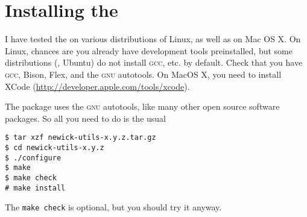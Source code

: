 \chapter{Installing the \nutils}

I have tested the \nutils{} on various distributions of Linux, as well as on
Mac OS X. On Linux, chances are you already have development tools
preinstalled, but some distributions (\eg, Ubuntu) do not install \textsc{gcc},
etc. by default. Check that you have \textsc{gcc},
Bison, Flex, and the \textsc{gnu} autotools. On MacOS X, you need to
install XCode (\url{http://developer.apple.com/tools/xcode}). 

The package uses the \textsc{gnu} autotools, like many other open source
software packages. So all you need to do is the usual
\begin{verbatim}
$ tar xzf newick-utils-x.y.z.tar.gz
$ cd newick-utils-x.y.z
$ ./configure
$ make
$ make check
# make install
\end{verbatim}
The \texttt{make check} is optional, but you should try it anyway.
